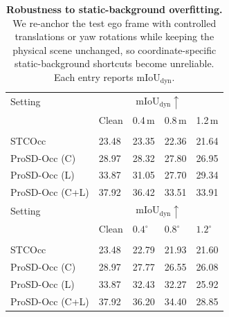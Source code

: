 \begin{table}[!tbp]
\caption{\textbf{Robustness to static-background overfitting.} We re-anchor the
test ego frame with controlled translations or yaw rotations while keeping the
physical scene unchanged, so coordinate-specific static-background shortcuts
become unreliable. Each entry reports $\mathrm{mIoU}_{\mathrm{dyn}}$.}
\label{tab:background_overfitting}
\centering
\scriptsize
\setlength{\tabcolsep}{2.2pt}
\renewcommand{\arraystretch}{1.08}
\begin{tabularx}{\columnwidth}{@{}>{\raggedright\arraybackslash}X C{1.08cm}C{1.08cm}C{1.08cm}C{1.08cm}@{}}
\toprule
Setting &  \\
\cmidrule(lr){2-5}
& Clean & 0.4\,m & 0.8\,m & 1.2\,m \\
\midrule
{} \\
STCOcc~\cite{STCOcc} & 23.48 & 23.35 & 22.36 & 21.64 \\
ProSD-Occ (C) & 28.97 & 28.32 & 27.80 & 26.95 \\
ProSD-Occ (L) & 33.87 & 31.05 & 27.70 & 29.34 \\
ProSD-Occ (C+L) & 37.92 & 36.42 & 33.51 & 33.91 \\
\midrule
Setting &  \\
\cmidrule(lr){2-5}
& Clean & $0.4^\circ$ & $0.8^\circ$ & $1.2^\circ$ \\
\midrule
{} \\
STCOcc~\cite{STCOcc} & 23.48 & 22.79 & 21.93 & 21.60 \\
ProSD-Occ (C) & 28.97 & 27.77 & 26.55 & 26.08 \\
ProSD-Occ (L) & 33.87 & 32.43 & 32.27 & 25.92 \\
ProSD-Occ (C+L) & 37.92 & 36.20 & 34.40 & 28.85 \\
\bottomrule
\end{tabularx}
\end{table}
